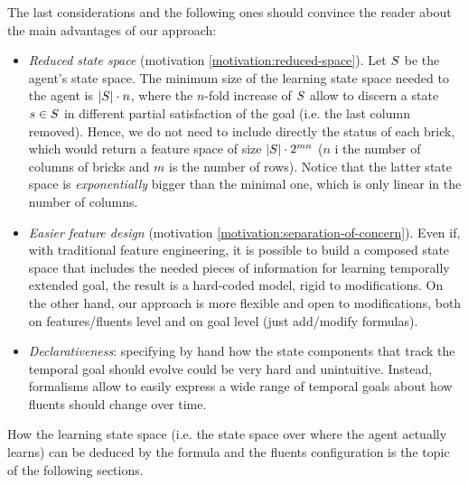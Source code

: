 \begin{example}
	The last considerations and the following ones should convince the reader about the main advantages of our approach:
	\begin{itemize} 
		\item \emph{Reduced state space} (motivation \ref{motivation:reduced-space}). Let $S$ be the agent's state space. The minimum size of the learning state space needed to the agent is $|S| \cdot n$, where the $n$-fold increase of $S$  allow to discern a state $s\in S$ in different partial satisfaction of the goal (i.e. the last column removed). Hence, we do not need to include directly the status of each brick, which would return a feature space of size $|S| \cdot 2^{mn}$ ($n$ i the number of columns of bricks and $m$ is the number of rows). Notice that the latter state space is \emph{exponentially} bigger than the minimal one, which is only linear in the number of columns. 
		\item \emph{Easier feature design} (motivation \ref{motivation:separation-of-concern}). Even if, with traditional feature engineering, it is possible to build a composed state space that includes the needed pieces of information for learning temporally extended goal, the result is a hard-coded model, rigid to modifications. On the other hand, our approach is more flexible and open to modifications, both on features/fluents level and on \LLf goal level (just add/modify \LLf formulas).
		\item \emph{Declarativeness}: specifying by hand how the state components that track the temporal goal should evolve could be very hard and unintuitive. Instead, \LLf formalisms allow to easily express a wide range of temporal goals about how fluents should change over time.
	\end{itemize}
	
\end{example}

\medskip

How the learning state space (i.e. the state space over where the agent actually learns) can be deduced by the \LLf formula and the fluents configuration is the topic of the following sections.

